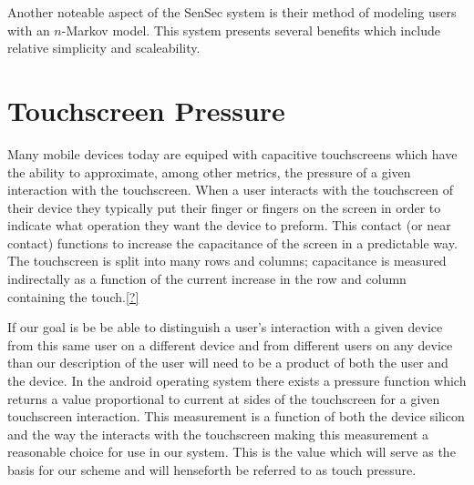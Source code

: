\documentclass{acm_proc_article-sp}
\begin{document}
Another noteable aspect of the SenSec system is their method of modeling users with an $n$-Markov model. This system presents several benefits which include relative simplicity and scaleability. \cite{zhu2013sensec} 

\cite{shi2011senguard}
\cite{feng2012continuous}



\section{Touchscreen Pressure}
\label{sec:touchscreen}
Many mobile devices today are equiped with capacitive touchscreens which have the ability to approximate, among other metrics, the pressure of a given interaction with the touchscreen. \cite{?} 
When a user interacts with the touchscreen of their device they typically put their finger or fingers on the screen in order to indicate what operation they want the device to preform. This contact (or near contact) functions to increase the capacitance of the screen in a predictable way. 
The touchscreen is split into many rows and columns; capacitance is measured indirectally as a function of the current increase in the row and column containing the touch.\ref{?} 

If our goal is be be able to distinguish a user's interaction with a given device from this same user on a different device and from different users on any device than our description of the user will need to be a product of both the user and the device. 
In the android operating system there exists a pressure function which returns a value proportional to current at sides of the touchscreen for a given touchscreen interaction. \cite{?} 
This measurement is a function of both the device silicon and the way the interacts with the touchscreen making this measurement a reasonable choice for use in our system.
This is the value which will serve as the basis for our scheme and will henseforth be referred to as touch pressure. 
\end{document}
